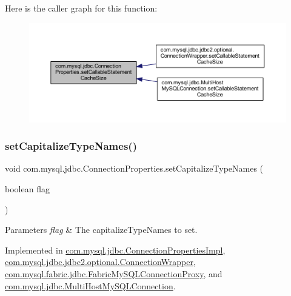 Here is the caller graph for this function\+:\nopagebreak
\begin{figure}[H]
\begin{center}
\leavevmode
\includegraphics[width=350pt]{interfacecom_1_1mysql_1_1jdbc_1_1_connection_properties_ab22fc3c53b2a21bf9064036222219e22_icgraph}
\end{center}
\end{figure}
\mbox{\label{interfacecom_1_1mysql_1_1jdbc_1_1_connection_properties_a4a5d21e7dfd9bedd2eb10f3169629288}} 
\subsubsection{\texorpdfstring{set\+Capitalize\+Type\+Names()}{setCapitalizeTypeNames()}}
{\footnotesize\ttfamily void com.\+mysql.\+jdbc.\+Connection\+Properties.\+set\+Capitalize\+Type\+Names (\begin{DoxyParamCaption}\item[{boolean}]{flag }\end{DoxyParamCaption})}


\begin{DoxyParams}{Parameters}
{\em flag} & The capitalize\+Type\+Names to set. \\
\hline
\end{DoxyParams}


Implemented in \mbox{\hyperlink{classcom_1_1mysql_1_1jdbc_1_1_connection_properties_impl_a4a84837603364f439b6129daaf0dc80d}{com.\+mysql.\+jdbc.\+Connection\+Properties\+Impl}}, \mbox{\hyperlink{classcom_1_1mysql_1_1jdbc_1_1jdbc2_1_1optional_1_1_connection_wrapper_a3f6d10819d7a5abdd49135f847c99fa4}{com.\+mysql.\+jdbc.\+jdbc2.\+optional.\+Connection\+Wrapper}}, \mbox{\hyperlink{classcom_1_1mysql_1_1fabric_1_1jdbc_1_1_fabric_my_s_q_l_connection_proxy_aef73532d80a23020a23fe68b220d02bf}{com.\+mysql.\+fabric.\+jdbc.\+Fabric\+My\+S\+Q\+L\+Connection\+Proxy}}, and \mbox{\hyperlink{classcom_1_1mysql_1_1jdbc_1_1_multi_host_my_s_q_l_connection_ac07f4457ad5a749c3abc81dec0fb0490}{com.\+mysql.\+jdbc.\+Multi\+Host\+My\+S\+Q\+L\+Connection}}.

